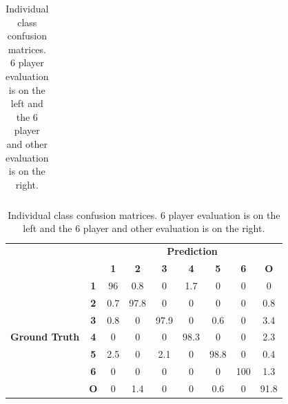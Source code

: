 \documentclass{article}
\begin{document}
{{{\begin{table}[h!]
\begin{minipage}{.5\linewidth}
\begin{tabular}{cc|c|c|c|c|c|c|}
\end{tabular}
    \end{minipage}%
    \begin{minipage}{.5\linewidth}
      \centering
\begin{tabular}{cc|c|c|c|c|c|c|c|}
\cline{3-9}
\multicolumn{1}{l}{}                                          & \multicolumn{1}{l|}{} & \multicolumn{7}{c|}{\textbf{Prediction}}                                               \\ \cline{3-9}
\multicolumn{1}{l}{}                                          & \multicolumn{1}{l|}{} & \textbf{1} & \textbf{2} & \textbf{3} & \textbf{4} & \textbf{5} & \textbf{6} & \textbf{O} \\ \hline
\multicolumn{1}{|c|}{\multirow{7}{*}{\begin{turn}{90}\textbf{Ground Truth}\end{turn}}} & \textbf{1}            & 96     & 0.8     & 0          & 1.7           
     & 0          & 0          & 0              \\ \cline{2-9} 
\multicolumn{1}{|c|}{}                                        & \textbf{2}            & 0.7     & 97.8     & 0          & 0          & 0          & 0          & 0.8         \\ \cline{2-9} 
\multicolumn{1}{|c|}{}                                        & \textbf{3}            & 0.8      & 0          & 97.9     & 0          & 0.6     & 0          & 3.4        \\ \cline{2-9} 
\multicolumn{1}{|c|}{}                                        & \textbf{4}            & 0          & 0          & 0          & 98.3     & 0          & 0          & 2.3         \\ \cline{2-9} 
\multicolumn{1}{|c|}{}                                        & \textbf{5}            & 2.5      & 0          & 2.1     & 0          & 98.8     & 0          & 0.4         \\ \cline{2-9} 
\multicolumn{1}{|c|}{}                                        & \textbf{6}            & 0          & 0          & 0          & 0          & 0          & 100     & 1.3         \\ \cline{2-9} 
\multicolumn{1}{|c|}{}                                        & \textbf{O}        & 0          & 1.4     & 0          & 0          & 0.6     & 0          & 91.8         \\ \hline
\end{tabular}%

    \end{minipage} 
    \caption{Individual class confusion matrices. 6 player evaluation is on the left and the 6 player and other evaluation is on the right.}
      \label{indconfs}  
\end{table}

}}}
\end{document}
